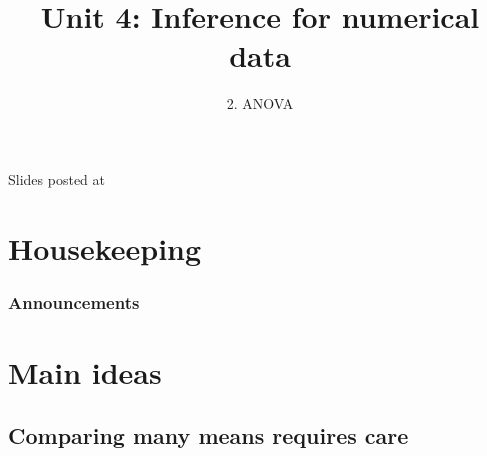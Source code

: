 \documentclass[slidestop,compress,mathserif,12pt,t,professionalfonts,xcolor=table]{beamer}
\title{Unit 4: Inference for numerical data}
\subtitle{2. ANOVA}
\author{\CourseName}
\date{}
\institute{\InstituteName}
\begin{document}



\begin{frame}[plain]

\titlepage

\vfill

{\scriptsize {} \hfill Slides posted at  \webURL{\CourseSite}}

\addtocounter{framenumber}{-1} 

\end{frame}


\section{Housekeeping}


\begin{frame}
\frametitle{Announcements}


%
%


\end{frame}


\section{Main ideas}


\subsection{Comparing many means requires care}
\label{mi1}

\end{document}
